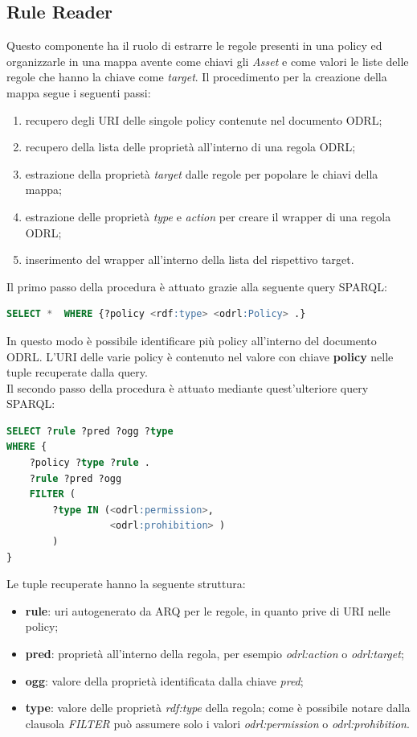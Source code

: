 \documentclass[12pt,a4paper,twoside]{book}
\begin{document}
\subsection{Rule Reader}
Questo componente ha il ruolo di estrarre le regole presenti in una policy ed organizzarle in una mappa avente come chiavi gli \textit{Asset} e come valori le liste delle regole che hanno la chiave come \textit{target}. Il procedimento per la creazione della mappa segue i seguenti passi:
\begin{enumerate}
\item recupero degli URI delle singole policy contenute nel documento ODRL;
\item recupero della lista delle proprietà all'interno di una regola ODRL;
\item estrazione della proprietà \textit{target} dalle regole per popolare le chiavi della mappa;
\item estrazione delle proprietà \textit{type} e \textit{action} per creare il wrapper di una regola ODRL;
\item inserimento del wrapper all'interno della lista del rispettivo target.
\end{enumerate} 
Il primo passo della procedura è attuato grazie alla seguente query SPARQL:
\begin{lstlisting}[language=sql,firstnumber=1,caption={Query per il recupero dei dati relativi a tutte le policy contenute nel documento ODRL},captionpos=b]
SELECT *  WHERE {?policy <rdf:type> <odrl:Policy> .}
\end{lstlisting}
In questo modo è possibile identificare più policy all'interno del documento ODRL. L'URI delle varie policy è contenuto nel valore con chiave \textbf{policy} nelle tuple recuperate dalla query.\\
Il secondo passo della procedura è attuato mediante quest'ulteriore query SPARQL:
\begin{lstlisting}[language=sql,firstnumber=1,caption={Query per il recupero delle proprietà di tutte le regole},captionpos=b]
SELECT ?rule ?pred ?ogg ?type
WHERE {
	?policy ?type ?rule .
	?rule ?pred ?ogg
	FILTER (
		?type IN (<odrl:permission>,
		          <odrl:prohibition> )
		)
}
\end{lstlisting}
Le tuple recuperate hanno la seguente struttura:
\begin{itemize}
\item \textbf{rule}: uri autogenerato da ARQ per le regole, in quanto prive di URI nelle policy;
\item \textbf{pred}: proprietà all'interno della regola, per esempio \textit{odrl:action} o \textit{odrl:target};
\item \textbf{ogg}: valore della proprietà identificata dalla chiave \textit{pred};
\item \textbf{type}: valore delle proprietà \textit{rdf:type} della regola; come è possibile notare dalla clausola \textit{FILTER} può assumere solo i valori \textit{odrl:permission} o \textit{odrl:prohibition}.
\end{itemize}
\end{document}
